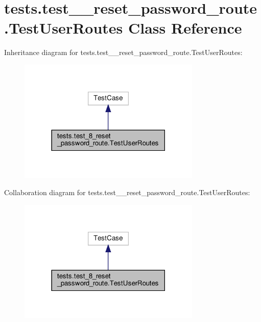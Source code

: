 \hypertarget{classtests_1_1test__8__reset__password__route_1_1_test_user_routes}{}\section{tests.\+test\+\_\+\_\+reset\+\_\+password\+\_\+route.\+Test\+User\+Routes Class Reference}
\label{classtests_1_1test__8__reset__password__route_1_1_test_user_routes}


Inheritance diagram for tests.\+test\+\_\+\_\+reset\+\_\+password\+\_\+route.\+Test\+User\+Routes\+:\nopagebreak
\begin{figure}[H]
\begin{center}
\leavevmode
\includegraphics[width=246pt]{classtests_1_1test__8__reset__password__route_1_1_test_user_routes__inherit__graph}
\end{center}
\end{figure}


Collaboration diagram for tests.\+test\+\_\+\_\+reset\+\_\+password\+\_\+route.\+Test\+User\+Routes\+:\nopagebreak
\begin{figure}[H]
\begin{center}
\leavevmode
\includegraphics[width=246pt]{classtests_1_1test__8__reset__password__route_1_1_test_user_routes__coll__graph}
\end{center}
\end{figure}
